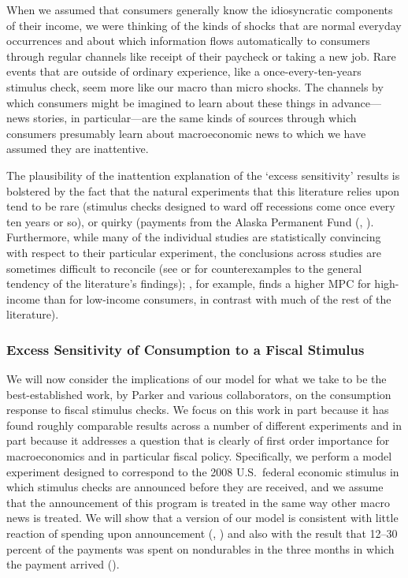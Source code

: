 \documentclass[titlepage]{article}
\begin{document}
When we assumed that consumers generally know the idiosyncratic components of their income, we were thinking of the kinds of shocks that are normal everyday occurrences and about which information flows automatically to consumers through regular channels like receipt of their paycheck or taking a new job.  Rare events that are outside of ordinary experience, like a once-every-ten-years stimulus check, seem more like our macro than micro shocks.  The channels by which consumers might be imagined to learn about these things in advance---news stories, in particular---are the same kinds of sources through which consumers presumably learn about macroeconomic news to which we have assumed they are inattentive. 

The plausibility of the inattention explanation of the `excess sensitivity' results is bolstered by the fact that the natural experiments that this literature relies upon tend to be rare (stimulus checks designed to ward off recessions come once every ten years or so), or quirky (payments from the Alaska Permanent Fund (\cite{hsiehAlaska}, \cite{kuengAlaska}).  Furthermore, while many of the individual studies are statistically convincing with respect to their particular experiment, the conclusions across studies are sometimes difficult to reconcile (see \cite{hsiehAlaska} or \cite{CoulibalyLiMortgage} for counterexamples to the general tendency of the literature's findings); \cite{kuengAlaska}, for example, finds a higher MPC for high-income than for low-income consumers, in contrast with much of the rest of the literature).

\subsubsection{Excess Sensitivity of Consumption to a Fiscal Stimulus}

We will now consider the implications of our model for what we take to be the best-established work, by Parker and various collaborators, on the consumption response to fiscal stimulus checks. We focus on this work in part because it has found roughly comparable results across a number of different experiments and in part because it addresses a question that is clearly of first order importance for macroeconomics and in particular fiscal policy. Specifically, we perform a model experiment designed to correspond to the 2008 U.S.\ federal economic stimulus in which stimulus checks are announced before they are received, and we assume that the announcement of this program is treated in the same way other macro news is treated. We will show that a version of our model is consistent with little reaction of spending upon announcement (\cite{brodaParker}, \cite{parker25million}) and also with the result that 12--30 percent of the payments was spent on nondurables in the three months in which the payment arrived (\cite{psjmMPC2008}).
\end{document}
